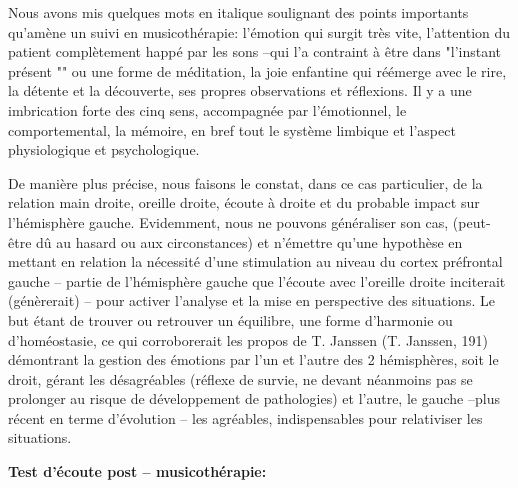       Nous avons mis quelques mots en italique soulignant des  points
      importants qu'amène un suivi en musicothérapie: l'émotion qui surgit très
      vite,
      l'attention du patient complètement happé par les sons --qui l'a
      contraint à être dans "l'instant présent "" ou une forme de méditation, la joie
      enfantine qui réémerge avec le rire, la détente et la découverte,
      ses propres observations et réflexions.
      Il y a une imbrication forte des cinq sens, accompagnée par l'émotionnel, le comportemental, la
      mémoire, en bref tout le système limbique et l'aspect
      physiologique et psychologique.

      De manière plus précise, nous faisons le constat, dans ce cas
      particulier,  de la relation main droite, oreille droite, écoute
      à droite et du probable impact sur l'hémisphère gauche.
      Evidemment, nous ne pouvons généraliser son cas, (peut-être dû au hasard ou aux circonstances) et n'émettre qu'une hypothèse
      en mettant en relation la nécessité d'une stimulation au niveau du cortex préfrontal
      gauche -- partie de l'hémisphère gauche que l'écoute avec
      l'oreille droite inciterait (génèrerait) -- pour activer l'analyse et la
      mise en perspective des situations. Le but étant de trouver ou
      retrouver un équilibre, une forme d'harmonie ou d'homéostasie, ce qui corroborerait les
      propos de T. Janssen (T. Janssen, 191)  démontrant la gestion des émotions par
      l'un et l'autre des 2 hémisphères, soit le droit,  gérant les désagréables
      (réflexe de survie, ne devant néanmoins pas se prolonger au risque de
      développement de pathologies)
      et l'autre, le gauche --plus récent en terme d'évolution -- les
      agréables, indispensables pour relativiser les situations.


\textbf{ Test d'écoute post -- musicothérapie:}



